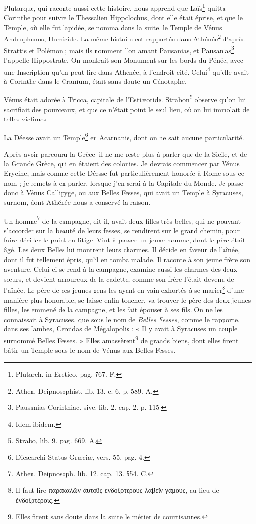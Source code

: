 \documentclass[a4paper, 11pt, oneside, polutonikogreek, french]{article}
\begin{document}
Plutarque, qui raconte aussi cette histoire, nous apprend que Laïs\footnote{Plutarch. in Erotico. pag. 767. F.} quitta Corinthe pour suivre le Thessalien Hippolochus, dont elle était éprise, et que le Temple, où elle fut lapidée, se nomma dans la suite, le Temple de Vénus Androphonos, Homicide. La même histoire est rapportée dans Athénée\footnote{Athen. Deipnosophist. lib. 13. c. 6. p. 589. A.} d'après Strattis et Polémon ; mais ils nomment l'on amant Pausanias, et Pausanias\footnote{Pausanias Corinthiac. sive, lib. 2. cap. 2. p. 115.} l'appelle Hippostrate. On montrait son Monument sur les bords du Pénée, avec une Inscription qu'on peut lire dans Athénée, à l'endroit cité. Celui\footnote{Idem ibidem.} qu'elle avait à Corinthe dans le Cranium, était sans doute un Cénotaphe.

Vénus était adorée à Tricca, capitale de l'Estiæotide. Strabon\footnote{Strabo, lib. 9. pag. 669. A.} observe qu'on lui sacrifiait des pourceaux, et que ce n'était point le seul lieu, où on lui immolait de telles victimes.

La Déesse avait un Temple\footnote{Dicæarchi Status Græciæ, vers. 55. pag. 4.} en Acarnanie, dont on ne sait aucune particularité.

Après avoir parcouru la Grèce, il ne me reste plus à parler que de la Sicile, et de la Grande Grèce, qui en étaient des colonies. Je devrais commencer par Vénus Erycine, mais comme cette Déesse fut particulièrement honorée à Rome sous ce nom ; je remets à en parler, lorsque j'en serai à la Capitale du Monde. Je passe donc à Vénus Callipyge, ou aux Belles Fesses, qui avait un Temple à Syracuses, surnom, dont Athénée nous a conservé la raison.

Un homme\footnote{Athen. Deipnosoph. lib. 12. cap. 13. 554. C.} de la campagne, dit-il, avait deux filles très-belles, qui ne pouvant s'accorder sur la beauté de leurs fesses, se rendirent sur le grand chemin, pour faire décider le point en litige. Vint à passer un jeune homme, dont le père était âgé. Les deux Belles lui montrent leurs charmes. Il décide en faveur de l'aînée, dont il fut tellement épris, qu'il en tomba malade. Il raconte à son jeune frère son aventure. Celui-ci se rend à la campagne, examine aussi les charmes des deux sœurs, et devient amoureux de la cadette, comme son frère l'était devenu de l'aînée. Le père de ces jeunes gens les ayant en vain exhortés à se marier\footnote{Il faut lire παρακαλῶν ἀυτοῦς ενδοξοτέρους λαβεῖν γάμους, au lieu de ἐνδοξοτέροις.} d'une manière plus honorable, se laisse enfin toucher, va trouver le père des deux jeunes filles, les emmené de la campagne, et les fait épouser à ses fils. On ne les connaissait à Syracuses, que sous le nom de \emph{Belles Fesses}, comme le rapporte, dans ses Iambes, Cercidas de Mégalopolis : « Il y avait à Syracuses un couple surnommé Belles Fesses. » Elles amassèrent\footnote{Elles firent sans doute dans la suite le métier de courtisannes.} de grands biens, dont elles firent bâtir un Temple sous le nom de Vénus aux Belles Fesses.
\end{document}
